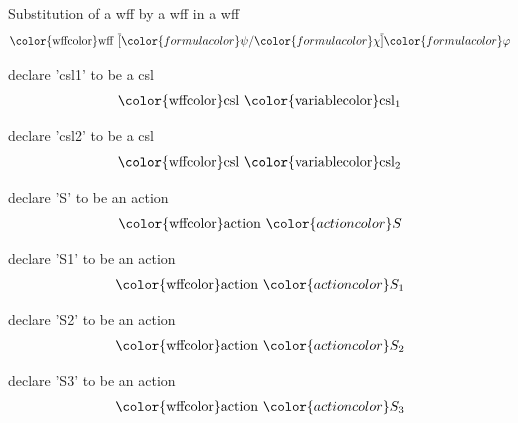 \begin{lemma} Substitution of a wff by a wff in a wff
\begin{align}
{\rm\color{wffcolor} wff~} \overline{[} {\color{formulacolor}\psi} /
    {\color{formulacolor}\chi} \overline{]}
    {\color{formulacolor}\varphi}\label{wsbw}
\end{align}
\end{lemma}

\begin{lemma} declare 'csl1' to be a csl
\begin{align}
{\rm\color{wffcolor} csl}~ {\rm\color{variablecolor}csl_1}\label{ccsl1}
\end{align}
\end{lemma}

\begin{lemma} declare 'csl2' to be a csl
\begin{align}
{\rm\color{wffcolor} csl}~ {\rm\color{variablecolor}csl_2}\label{ccsl2}
\end{align}
\end{lemma}

\begin{lemma} declare 'S' to be an action
\begin{align}
{\rm\color{wffcolor}action}~ {\color{actioncolor}S}\label{as}
\end{align}
\end{lemma}

\begin{lemma} declare 'S1' to be an action
\begin{align}
{\rm\color{wffcolor}action}~ {\color{actioncolor}S_1}\label{as1}
\end{align}
\end{lemma}

\begin{lemma} declare 'S2' to be an action
\begin{align}
{\rm\color{wffcolor}action}~ {\color{actioncolor}S_2}\label{as2}
\end{align}
\end{lemma}

\begin{lemma} declare 'S3' to be an action
\begin{align}
{\rm\color{wffcolor}action}~ {\color{actioncolor}S_3}\label{as3}
\end{align}
\end{lemma}

